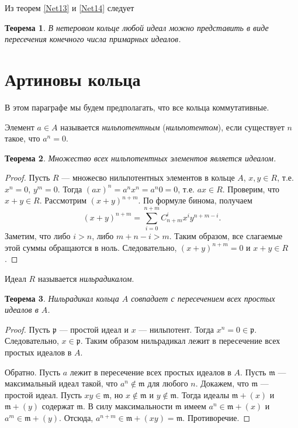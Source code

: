 \documentclass[12pt, titlepage, oneside]{amsbook}
\newcommand{\ppp}{\mathfrak{p}}
\newcommand{\mmm}{\mathfrak{m}}
\newtheorem{theorem}{Теорема}[chapter]
\theoremstyle{definition}
\theoremstyle{remark}
\begin{document}
Из теорем \ref{Net13} и \ref{Net14} следует

\begin{theorem}
	\label{Net15}
	В нетеровом кольце любой идеал можно представить в виде пересечения конечного числа примарных идеалов.
\end{theorem}

\section{Артиновы кольца}

В этом параграфе мы будем предполагать, что все кольца коммутативные.

Элемент $a\in A$ называется \emph{нильпотентным} (\emph{нильпотентом}), если существует $n$ такое, что $a^n=0$.

\begin{theorem}
	\label{Rad1}
	Множество всех нильпотентных элементов является идеалом.
\end{theorem}

\begin{proof}
	Пусть $R$ --- множесво нильпотентных элементов в кольце $A$, $x,y\in R$, т.е. $x^n=0$, $y^m=0$. Тогда $(ax)^n=a^nx^n=a^n0=0$, т.е. $ax\in R$. Проверим, что $x+y\in R$. Рассмотрим $(x+y)^{n+m}$. По формуле бинома, получаем $$(x+y)^{n+m}=\sum\limits_{i=0}^{n+m}C_{n+m}^ix^iy^{n+m-i}.$$ Заметим, что либо $i>n$, либо $m+n-i>m$. Таким образом, все слагаемые этой суммы обращаются в ноль. Следовательно, $(x+y)^{n+m}=0$ и $x+y\in R$.
\end{proof}

Идеал $R$ называется \emph{нильрадикалом}.

\begin{theorem}
	\label{Rad2}
	Нильрадикал кольца $A$ совпадает с пересечением всех простых идеалов в $A$.
\end{theorem}

\begin{proof}
	Пусть $\ppp$ --- простой идеал и $x$ --- нильпотент. Тогда $x^n=0\in\ppp$. Следовательно, $x\in\ppp$. Таким образом нильрадикал лежит в пересечение всех простых идеалов в $A$.
	
	Обратно. Пусть $a$ лежит в пересечение всех простых идеалов в $A$. Пусть $\mmm$ --- максимальный идеал такой, что $a^n\not\in\mmm$ для любого $n$. Докажем, что $\mmm$  --- простой идеал. Пусть $xy\in\mmm$, но $x\not\in\mmm$ и $y\not\in\mmm$. Тогда идеалы $\mmm+(x)$ и $\mmm+(y)$ содержат $\mmm$. В силу максимальности $\mmm$ имеем $a^n\in \mmm+(x)$ и $a^m\in\mmm+(y)$. Отсюда, $a^{n+m}\in \mmm+(xy)=\mmm$. Противоречие.
\end{proof}
\end{document}
